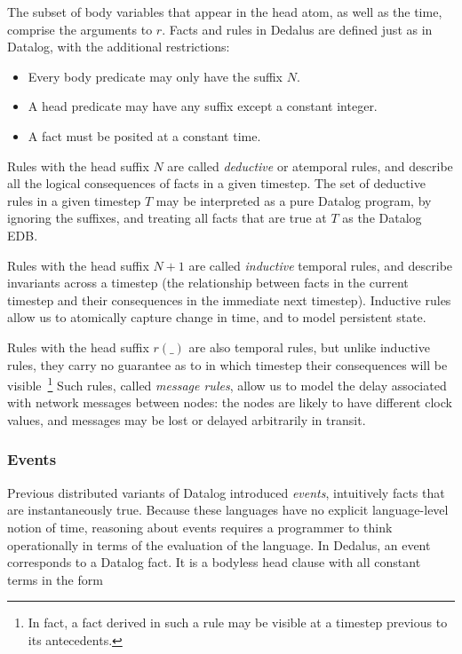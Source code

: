 The subset of body variables that appear in the head atom, as well as the time,
comprise the arguments to $r$.  Facts and rules in Dedalus are 
defined just as in Datalog, with the additional restrictions:

\begin{itemize}
\item Every body predicate may only have the suffix $N$.
\item A head predicate may have any suffix except a constant integer.
\item A fact must be posited at a constant time.
\end{itemize}

Rules with the head suffix $N$ are called \emph{deductive} or atemporal rules,
and describe all the logical consequences of facts in a given timestep.  The
set of deductive rules in a given timestep $T$ may be interpreted as a pure
Datalog program, by ignoring the suffixes, and treating all facts that are true
at $T$ as the Datalog EDB.

Rules with the head suffix $N + 1$ are called \emph{inductive} temporal rules,
and describe invariants across a timestep (the relationship between facts in
the current timestep and their consequences in the immediate next timestep).
Inductive rules allow us to atomically capture change in time, and to model
persistent state.

Rules with the head suffix $r(\_)$ are also temporal rules, but unlike
inductive rules, they carry no guarantee as to in which timestep their
consequences will be visible~\footnote{In fact, a fact derived in such a rule
may be visible at a timestep previous to its antecedents.} Such rules, called
{\em message rules}, allow us to model the delay associated with network
messages between nodes: the nodes are likely to have different clock values,
and messages may be lost or delayed arbitrarily in transit.


\subsubsection{Events}

Previous distributed variants of Datalog introduced {\em events}, intuitively
facts that are instantaneously true.  Because these languages have no explicit
language-level notion of time, reasoning about events requires a programmer to
think operationally in terms of the evaluation of the language.  In Dedalus,
an event corresponds to a Datalog fact.  It is a bodyless head clause with all 
constant terms in the form


